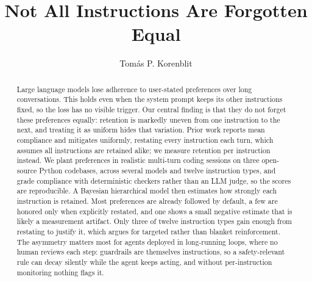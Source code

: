 \documentclass{llncs}
\begin{document}

\title{Not All Instructions Are Forgotten Equal}

\author{Tom\'as P. Korenblit}

\maketitle

\begin{abstract}
Large language models lose adherence to user-stated preferences over
long conversations. This holds even when the system prompt keeps its other
instructions fixed, so the loss has no visible trigger. Our central finding
is that they do not forget these preferences equally: retention is markedly
uneven from one instruction to the next, and treating it as uniform hides
that variation. Prior work reports mean compliance and mitigates
uniformly, restating every instruction each turn, which assumes all
instructions are retained alike; we measure retention per instruction
instead. We plant
preferences in realistic multi-turn coding sessions on three open-source
Python codebases, across several models and twelve instruction types, and
grade compliance with deterministic checkers rather than an LLM judge, so
the scores are reproducible. A Bayesian hierarchical model then estimates
how strongly each instruction is retained. Most preferences are already
followed by default, a few are honored only when explicitly restated, and
one shows a small negative estimate that is likely a measurement artifact.
Only three of twelve
instruction types gain enough from restating to justify it, which argues
for targeted rather than blanket reinforcement. The asymmetry matters most
for agents deployed in long-running loops, where no human reviews each step:
guardrails are themselves instructions, so a safety-relevant rule can decay
silently while the agent keeps acting, and without per-instruction
monitoring nothing flags it.

\end{abstract}

\end{document}
